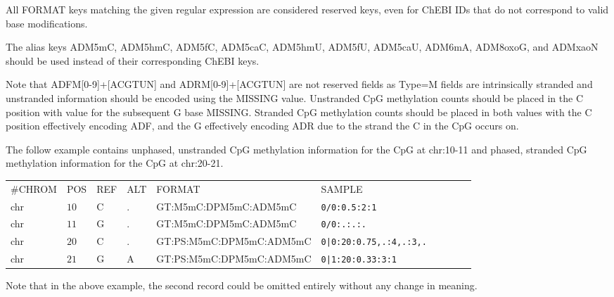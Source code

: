 \documentclass[8pt]{article}
\begin{document}
\begin{itemize}
  All FORMAT keys matching the given regular expression are considered reserved keys, even for ChEBI IDs that do not correspond to valid base modifications.

  The alias keys ADM5mC, ADM5hmC, ADM5fC, ADM5caC, ADM5hmU, ADM5fU, ADM5caU, ADM6mA, ADM8oxoG, and ADMxaoN should be used instead of their corresponding ChEBI keys.

  Note that ADFM[0-9]+[ACGTUN] and ADRM[0-9]+[ACGTUN] are not reserved fields as Type=M fields are intrinsically stranded and unstranded information should be encoded using the MISSING value.
  Unstranded CpG methylation counts should be placed in the C position with value for the subsequent G base MISSING.
  Stranded CpG methylation counts should be placed in both values with the C position effectively encoding ADF, and the G effectively encoding ADR due to the strand the C in the CpG occurs on.

  The follow example contains unphased, unstranded CpG methylation information for the CpG at chr:10-11 and phased, stranded CpG methylation information for the CpG at chr:20-21.

\vspace{0.5em}
\begin{tabular}{ l l l l l l l l l l}
	\#CHROM & POS & REF & ALT & FORMAT & SAMPLE\\
	chr & $10$ & C & .         & GT:M5mC:DPM5mC:ADM5mC       & \tt{0/0:0.5:2:1}\\
	chr & $11$ & G & .         & GT:M5mC:DPM5mC:ADM5mC       & \tt{0/0:.:.:.}\\
	chr & $20$ & C & .         & GT:PS:M5mC:DPM5mC:ADM5mC       & \tt{0|0:20:0.75,.:4,.:3,.}\\
	chr & $21$ & G & A         & GT:PS:M5mC:DPM5mC:ADM5mC       & \tt{0|1:20:0.33:3:1}\\
\end{tabular}

  Note that in the above example, the second record could be omitted entirely without any change in meaning.



\end{itemize}
\end{document}
